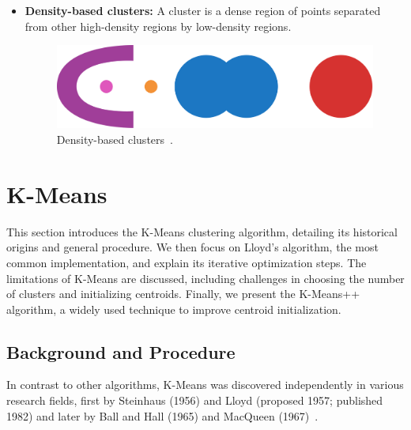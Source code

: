 \documentclass[10pt,twocolumn,letterpaper]{article}
\begin{document}
\begin{itemize}
    \item\textbf{Density-based clusters:} A cluster is a dense region of points separated from other high-density
          regions by low-density regions.
          \begin{figure}[h]
              \centering
              \includegraphics[width=0.5\linewidth]{figures/Density-based clusters}
              \caption{Density-based clusters~\cite{Joshi2015}.}
              \label{fig:density-based-clusters}
          \end{figure}
\end{itemize}


\section{K-Means}\label{sec:k-means}

This section introduces the K-Means clustering algorithm, detailing its
historical origins and general procedure. We then focus on Lloyd’s algorithm,
the most common implementation, and explain its iterative optimization steps.
The limitations of K-Means are discussed, including challenges in choosing the
number of clusters and initializing centroids. Finally, we present the
K-Means++ algorithm, a widely used technique to improve centroid
initialization.

\subsection{Background and Procedure}\label{subsec:background-and-procedure}

In contrast to other algorithms, K-Means was discovered independently in
various research fields, first by Steinhaus (1956) and Lloyd (proposed 1957;
published 1982) and later by Ball and Hall (1965) and MacQueen
(1967)~\cite{Jain2010651}.
\end{document}
